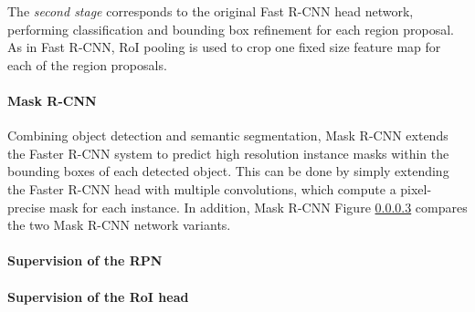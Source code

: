 The \emph{second stage} corresponds to the original Fast R-CNN head network, performing classification
and bounding box refinement for each region proposal.
As in Fast R-CNN, RoI pooling is used to crop one fixed size feature map for each of the region proposals.


\paragraph{Mask R-CNN}

Combining object detection and semantic segmentation, Mask R-CNN extends the Faster R-CNN system to predict
high resolution instance masks within the bounding boxes of each detected object.
This can be done by simply extending the Faster R-CNN head with multiple convolutions, which
compute a pixel-precise mask for each instance.
In addition, Mask R-CNN
Figure \ref{} compares the two Mask R-CNN network variants.

\paragraph{Supervision of the RPN}
\paragraph{Supervision of the RoI head}
